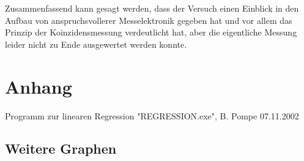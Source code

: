 \documentclass[numbers=noenddot,a4paper]{scrartcl}
\begin{document}
Zusammenfassend kann gesagt werden, dass der Versuch einen Einblick in den Aufbau von anspruchsvollerer Messelektronik gegeben hat und vor allem das Prinzip der Koinzidensmessung verdeutlicht hat, aber die eigentliche Messung leider nicht zu Ende ausgewertet werden konnte. 
\newpage

\section{Anhang}

		
		

		Programm zur linearen Regression "REGRESSION.exe", B. Pompe 07.11.2002

\subsection{Weitere Graphen}
\end{document}
